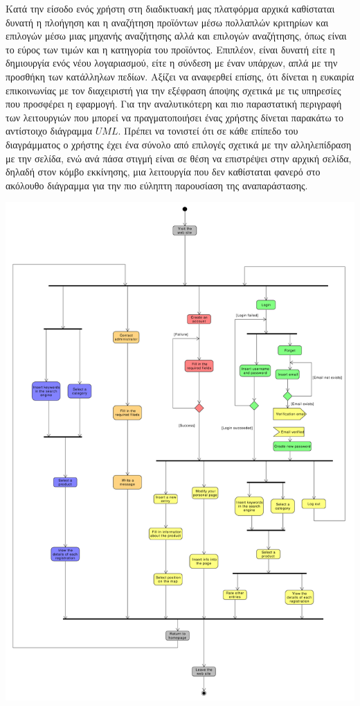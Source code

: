 \documentclass[12pt]{article}
\begin{document}
Κατά την είσοδο ενός χρήστη στη διαδικτυακή μας πλατφόρμα αρχικά καθίσταται δυνατή η πλοήγηση και η αναζήτηση προϊόντων μέσω πολλαπλών κριτηρίων και επιλογών μέσω μιας μηχανής αναζήτησης αλλά και επιλογών αναζήτησης, όπως είναι το εύρος των τιμών και η κατηγορία του προϊόντος. Επιπλέον, είναι δυνατή είτε η δημιουργία ενός νέου λογαριασμού, είτε η σύνδεση με έναν υπάρχων, απλά με την προσθήκη των κατάλληλων πεδίων. Αξίζει να αναφερθεί επίσης, ότι δίνεται η ευκαιρία επικοινωνίας με τον διαχειριστή για την εξέφραση άποψης σχετικά με τις υπηρεσίες που προσφέρει η εφαρμογή. Για την αναλυτικότερη και πιο παραστατική περιγραφή των λειτουργιών που μπορεί να πραγματοποιήσει ένας χρήστης δίνεται παρακάτω το αντίστοιχο διάγραμμα $UML$. Πρέπει να τονιστεί ότι σε κάθε επίπεδο του διαγράμματος ο χρήστης έχει ένα σύνολο από επιλογές σχετικά με την αλληλεπίδραση με την σελίδα, ενώ ανά πάσα στιγμή είναι σε θέση να επιστρέψει στην αρχική σελίδα, δηλαδή στον κόμβο εκκίνησης, μια λειτουργία που δεν καθίσταται φανερό στο ακόλουθο διάγραμμα για την πιο εύληπτη παρουσίαση της αναπαράστασης.
\begin{center}
\includegraphics[scale=0.27]{userActivityDiagram.pdf}
\end{center}
\end{document}
